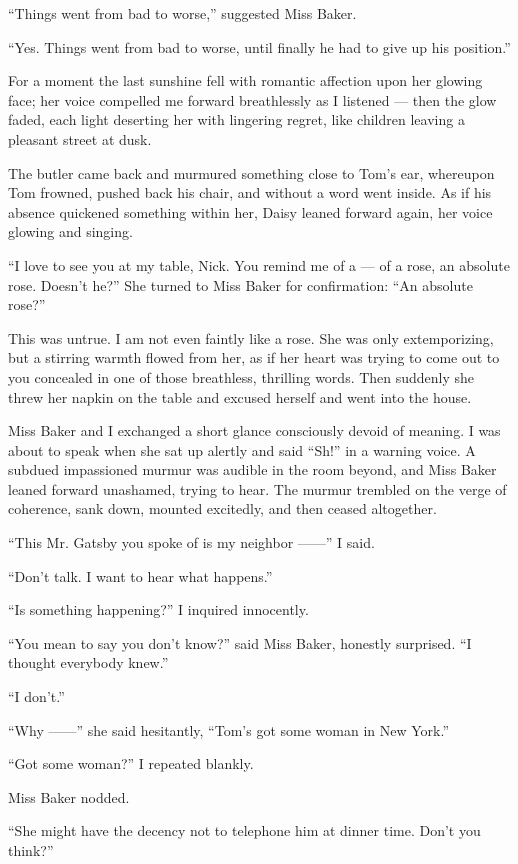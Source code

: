 \documentclass{znotebook}
\begin{document}
``Things went from bad to worse,'' suggested Miss Baker.

``Yes. Things went from bad to worse, until finally he had to give up his position.''

For a moment the last sunshine fell with romantic affection upon her glowing face; her voice compelled me forward breathlessly as I listened — then the glow faded, each light deserting her with lingering regret, like children leaving a pleasant street at dusk.

The butler came back and murmured something close to Tom's ear, whereupon Tom frowned, pushed back his chair, and without a word went inside. As if his absence quickened something within her, Daisy leaned forward again, her voice glowing and singing.

``I love to see you at my table, Nick. You remind me of a — of a rose, an absolute rose. Doesn't he?'' She turned to Miss Baker for confirmation: ``An absolute rose?''

This was untrue. I am not even faintly like a rose. She was only extemporizing, but a stirring warmth flowed from her, as if her heart was trying to come out to you concealed in one of those breathless, thrilling words. Then suddenly she threw her napkin on the table and excused herself and went into the house.

Miss Baker and I exchanged a short glance consciously devoid of meaning. I was about to speak when she sat up alertly and said ``Sh!'' in a warning voice. A subdued impassioned murmur was audible in the room beyond, and Miss Baker leaned forward unashamed, trying to hear. The murmur trembled on the verge of coherence, sank down, mounted excitedly, and then ceased altogether.

``This Mr. Gatsby you spoke of is my neighbor ——'' I said.

``Don't talk. I want to hear what happens.''

``Is something happening?'' I inquired innocently.

``You mean to say you don't know?'' said Miss Baker, honestly surprised. ``I thought everybody knew.''

``I don't.''

``Why ——'' she said hesitantly, ``Tom's got some woman in New York.''

``Got some woman?'' I repeated blankly.

Miss Baker nodded.

``She might have the decency not to telephone him at dinner time. Don't you think?''
\end{document}
